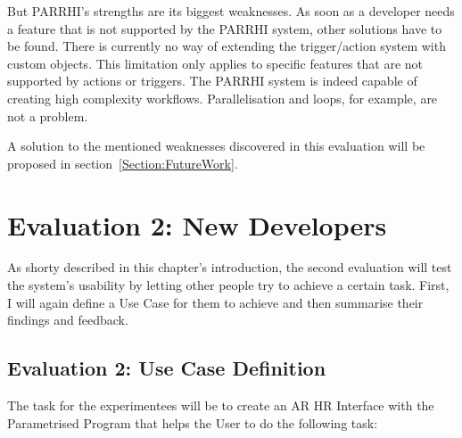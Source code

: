 But PARRHI's strengths are its biggest weaknesses. As soon as a developer needs a feature that is not supported by the PARRHI system, other solutions have to be found. There is currently no way of extending the trigger/action system with custom objects. This limitation only applies to specific features that are not supported by actions or triggers. The PARRHI system is indeed capable of creating high complexity workflows. Parallelisation and loops, for example, are not a problem.

A solution to the mentioned weaknesses discovered in this evaluation will be proposed in section~\ref{Section:FutureWork}.

\section{Evaluation 2: New Developers}
As shorty described in this chapter's introduction, the second evaluation will test the system's usability by letting other people try to achieve a certain task. First, I will again define a Use Case for them to achieve and then summarise their findings and feedback.

\subsection{Evaluation 2: Use Case Definition}
The task for the experimentees will be to create an AR HR Interface with the Parametrised Program that helps the User to do the following task:

\FloatBarrier


